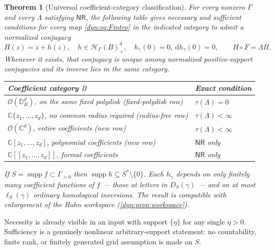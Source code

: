 \documentclass[11pt,letterpaper]{article}
\newtheorem{theorem}{Theorem}[section]
\theoremstyle{definition}
\theoremstyle{remark}
\newcommand{\C}{\mathbb C}
\newcommand{\HH}{\mathscr H}
\newcommand{\OO}{\mathcal O}
\newcommand{\supp}{\operatorname{supp}}
\newcommand{\nres}{\mathsf{NR}}
\numberwithin{equation}{section}
\begin{document}
\begin{theorem}[Universal coefficient-category classification]
\label{dyn:thm:main}
For every nonzero $\Gamma$ and every $\Lambda$ satisfying $\nres$, the
following table gives necessary and sufficient conditions for
\emph{every} map \eqref{dyn:eq:Fintro} in the indicated category to admit a
normalized conjugacy
\begin{equation}\label{dyn:eq:Schroeder}
 H(z)=z+h(z),\quad h\in\HH_\Gamma(B)_+^{d},\quad
 h_\gamma(0)=0,\ \mathrm dh_\gamma(0)=0,\qquad H\circ F=\Lambda H .
\end{equation}
Whenever it exists, that conjugacy is unique among normalized
positive-support conjugacies and its inverse lies in the same category.
{\normalfont
\begin{center}
\begin{tabular}{@{}P{0.62\textwidth}P{0.25\textwidth}@{}}
\toprule
Coefficient category $B$ & Exact condition\\
\midrule
$\OO(\mathbb D_R^{d})$, on the \emph{same fixed} polydisk
 (fixed-polydisk row) & $\tau(\Lambda)=0$\\
$\C\{z_1,\dots,z_d\}$, no common radius required (radius-free row)
 & $\tau(\Lambda)<\infty$\\
$\OO(\C^{d})$, entire coefficients (new row) & $\tau(\Lambda)<\infty$\\
$\C[z_1,\dots,z_d]$, polynomial coefficients (new row) & $\nres$ only\\
$\C[[z_1,\dots,z_d]]$, formal coefficients & $\nres$ only\\
\bottomrule
\end{tabular}
\end{center}}
If $S=\supp f\subset\Gamma_{>0}$ then $\supp h\subseteq S^{*}\setminus\{0\}$.
Each $h_\gamma$ depends on only finitely many coefficient functions of $f$
--- those at letters in $D_S(\gamma)$ --- and on at most $\ell_S(\gamma)$
ordinary homological inversions. The result is compatible with enlargement
of the Hahn workspace (\cref{dyn:prop:workspace}).
\end{theorem}

Necessity is already visible in an input with support $\{\eta\}$ for any
single $\eta>0$. Sufficiency is a genuinely nonlinear arbitrary-support
statement: no countability, finite rank, or finitely generated grid
assumption is made on $S$.
\end{document}
